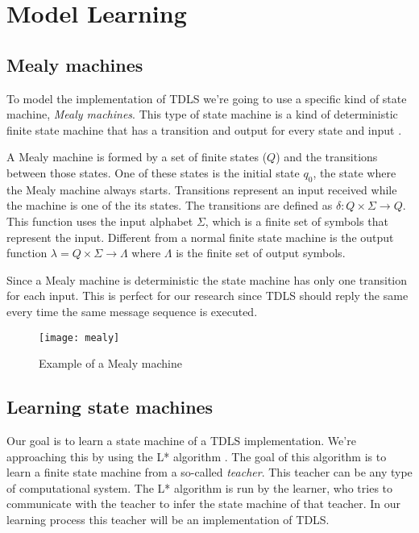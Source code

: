 \section{Model Learning}\label{modellearning}

\subsection{Mealy machines}

To model the implementation of TDLS we're going to use a specific kind of state machine, \emph{Mealy machines}. This type of state machine is a kind of deterministic finite state machine that has a transition and output for every state and input \cite{Mealy:1955}.

A Mealy machine is formed by a set of finite states (\(Q\)) and the transitions between those states. One of these states is the initial state \(q_0\), the state where the Mealy machine always starts. Transitions represent an input received while the machine is one of the its states. The transitions are defined as \(\delta : Q \times \Sigma \to Q\). This function uses the input alphabet \(\Sigma\), which is a finite set of symbols that represent the input. Different from a normal finite state machine is the output function \(\lambda = Q \times \Sigma \to \Lambda\) where \(\Lambda\) is the finite set of output symbols.

Since a Mealy machine is deterministic the state machine has only one transition for each input. This is perfect for our research since TDLS should reply the same every time the same message sequence is executed.

\begin{figure}[!h]
	\centering
	\texttt{[image: mealy]}
	\caption{Example of a Mealy machine}
	\label{fig:mealymachine}
\end{figure}

\subsection{Learning state machines}

Our goal is to learn a state machine of a TDLS implementation. We're approaching this by using the L* algorithm \cite{Angluin:1987}. The goal of this algorithm is to learn a finite state machine from a so-called \emph{teacher}. This teacher can be any type of computational system.
The L* algorithm is run by the learner, who tries to communicate with the teacher to infer the state machine of that teacher. In our learning process this teacher will be an implementation of TDLS.

